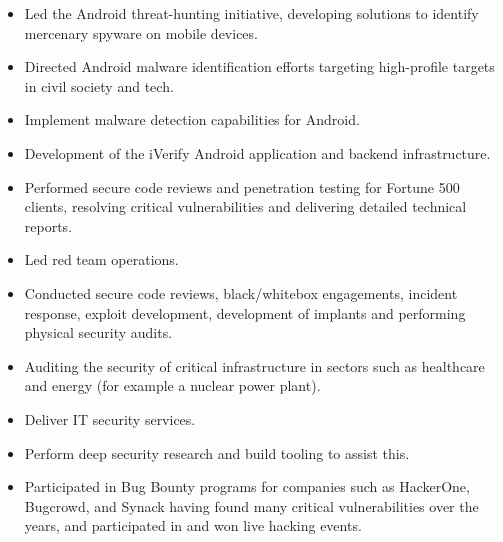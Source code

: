 \documentclass[10pt,a4paper,ragged2e,withhyper]{altacv}
\begin{document}
\begin{paracol}{2}

\begin{itemize}
\item Led the Android threat-hunting initiative, developing solutions to identify mercenary spyware on mobile devices.
\item Directed Android malware identification efforts targeting high-profile targets in civil society and tech.
\item Implement malware detection capabilities for Android.
\item Development of the iVerify Android application and backend infrastructure.
\end{itemize}

\divider
\vspace{0.5em}

\begin{itemize}
\item Performed secure code reviews and penetration testing for Fortune 500 clients, resolving critical vulnerabilities and delivering detailed technical reports.
\end{itemize}

\divider
\vspace{0.5em}

\begin{itemize}
\item Led red team operations.
\item Conducted secure code reviews, black/whitebox engagements, incident response, exploit development, development of implants and performing physical security audits.
\item Auditing the security of critical infrastructure in sectors such as healthcare and energy (for example a nuclear power plant).
\end{itemize}

\divider
\vspace{0.5em}

\begin{itemize}
\item Deliver IT security services.
\item Perform deep security research and build tooling to assist this.
\item Participated in Bug Bounty programs for companies such as HackerOne, Bugcrowd, and Synack having found many critical vulnerabilities over the years, and participated in and won live hacking events.
\end{itemize}


\end{paracol}
\end{document}

